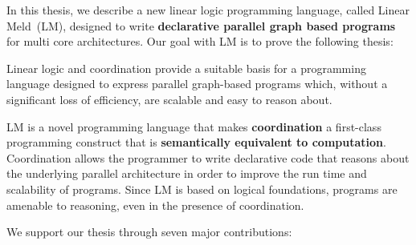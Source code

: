 
In this thesis, we describe a new linear logic programming language, called
Linear Meld~(LM), designed to write \textbf{declarative parallel graph based
programs} for multi core architectures. Our goal with LM is to prove the
following thesis:

\vspace{10px}
\begin{displayquote}
Linear logic and coordination provide a suitable basis for a programming
language designed to express parallel graph-based programs which, without a
significant loss of efficiency, are scalable and easy to reason about.
\end{displayquote}
\vspace{10px}

LM is a novel programming language that makes \textbf{coordination} a
first-class programming construct that is \textbf{semantically equivalent to
computation}. Coordination allows the programmer to write declarative code that
reasons about the underlying parallel architecture in order to improve the run
time and scalability of programs. Since LM is based on logical foundations,
programs are amenable to reasoning, even in the presence of coordination.

We support our thesis through seven major contributions:

